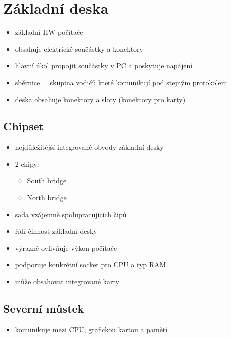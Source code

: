 \documentclass[a4paper,12pt]{article}
\providecommand{\tightlist}{%
\setlength{\itemsep}{0pt}\setlength{\parskip}{0pt}}
\begin{document}
\section{Základní deska}

\begin{itemize}
  \tightlist
  \item základní HW počítače
  \item obsahuje elektrické součástky a konektory
  \item hlavní úkol propojit součástky v PC a poskytuje napájení
  \item sběrnice = skupina vodičů které komunikují pod stejným protokolem
  \item deska obsahuje konektory a sloty (konektory pro karty)
\end{itemize}


\subsection{Chipset}

\begin{itemize}
  \tightlist
  \item nejdůležitější integrované obvody základní desky
  \item 2 chipy:
  \begin{itemize}
    \tightlist
    \item South bridge
    \item North bridge
  \end{itemize}
  \item sada vzájemně spolupracujících čipů
  \item řídí činnost základní desky
  \item výrazně ovlivňuje výkon počítače
  \item podporuje konkrétní socket pro CPU a typ RAM
  \item může obsahovat integrované karty
\end{itemize}

\subsection{Severní můstek}

\begin{itemize}
  \item komunikuje mezi CPU, grafickou kartou a pamětí
\end{itemize}
\end{document}
